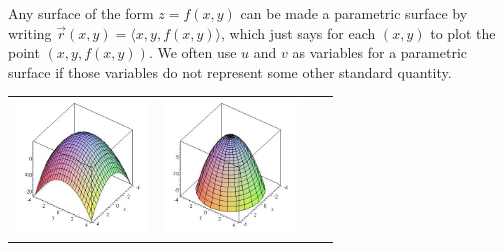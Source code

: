Any surface of the form $z=f(x,y)$ can be made a parametric surface by
writing $\vec r(x,y)=\langle x,y,f(x,y)\rangle$, which just says for
each $(x,y)$ to plot the point $(x,y,f(x,y))$. We often use $u$ and
$v$ as variables for a parametric surface if those variables do not
represent some other standard quantity.

\renewcommand{\mywidth}{1.4in}
\begin{center}
\begin{tabular}{cccc}
\includegraphics[width=\mywidth]{functions/parasurface-1}&
\includegraphics[width=\mywidth]{functions/parasurface-2}&

\end{tabular}
\end{center}
